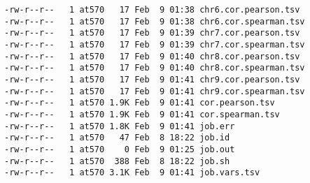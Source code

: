 \begin{lstlisting}
-rw-r--r--   1 at570   17 Feb  9 01:38 chr6.cor.pearson.tsv
-rw-r--r--   1 at570   17 Feb  9 01:38 chr6.cor.spearman.tsv
-rw-r--r--   1 at570   17 Feb  9 01:39 chr7.cor.pearson.tsv
-rw-r--r--   1 at570   17 Feb  9 01:39 chr7.cor.spearman.tsv
-rw-r--r--   1 at570   17 Feb  9 01:40 chr8.cor.pearson.tsv
-rw-r--r--   1 at570   17 Feb  9 01:40 chr8.cor.spearman.tsv
-rw-r--r--   1 at570   17 Feb  9 01:41 chr9.cor.pearson.tsv
-rw-r--r--   1 at570   17 Feb  9 01:41 chr9.cor.spearman.tsv
-rw-r--r--   1 at570 1.9K Feb  9 01:41 cor.pearson.tsv
-rw-r--r--   1 at570 1.9K Feb  9 01:41 cor.spearman.tsv
-rw-r--r--   1 at570 1.8K Feb  9 01:41 job.err
-rw-r--r--   1 at570   47 Feb  8 18:22 job.id
-rw-r--r--   1 at570    0 Feb  9 01:25 job.out
-rw-r--r--   1 at570  388 Feb  8 18:22 job.sh
-rw-r--r--   1 at570 3.1K Feb  9 01:41 job.vars.tsv
\end{lstlisting}
% 
\clearpage